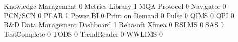 \documentclass{article}
\begin{document}
\begin{Schunk}
\begin{Soutput}
  Knowledge Management                                                         0
  Metrics Library                                                              1
  MQA Protocol                                                                 0
  Navigator                                                                    0
  PCN/SCN                                                                      0
  PEAR                                                                         0
  Power BI                                                                     0
  Print on Demand                                                              0
  Pulse                                                                        0
  QIMS                                                                         0
  QPI                                                                          0
  R&D Data Management Dashboard                                                1
  Reliasoft Xfmea                                                              0
  RSLMS                                                                        0
  SAS                                                                          0
  TestComplete                                                                 0
  TODS                                                                         0
  TrendReader                                                                  0
  WWLIMS                                                                       0
                                                           

\end{Soutput}
\end{Schunk}
\end{document}
